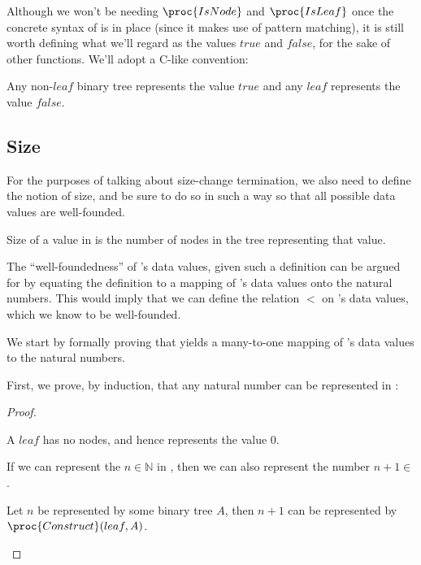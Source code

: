 Although we won't be needing $\proc{IsNode}$ and $\proc{IsLeaf}$ once the
concrete syntax of  is in place (since it makes use of pattern
matching), it is still worth defining what we'll regard as the values $true$
and $false$, for the sake of other functions. We'll adopt a C-like convention:

\begin{definition}\label{definition:true-false}

Any non-$leaf$ binary tree represents the value $true$ and any $leaf$
represents the value $false$.

\end{definition}

\subsection{Size}

For the purposes of talking about size-change termination, we also need to
define the notion of size, and be sure to do so in such a way so that all
possible data values are well-founded.

\begin{definition}\label{definition:size}

Size of a value in  is the number of nodes in the tree representing
that value.

\end{definition}

The ``well-foundedness'' of 's data values, given such a definition can
be argued for by equating the definition to a mapping of 's data values
onto the natural numbers. This would imply that we can define the relation $<$
on 's data values, which we know to be well-founded. 

We start by formally proving that  yields a many-to-one
mapping of 's data values to the natural numbers.

First, we prove, by induction, that any natural number can be represented in
:

\begin{proof}\ \\

\begin{description}[\setleftmargin{70pt}\setlabelstyle{\bf}]

\item [Base] A $leaf$ has no nodes, and hence represents the value $0$.

\item [Assumption] If we can represent the $n\in\mathbb{N}$ in , then
we can also represent the number $n+1\in$. 

\item [Induction] Let $n$ be represented by some binary tree $A$, then $n+1$
can be represented by $\proc{Construct}(leaf,A)$. 

\end{description}

\end{proof}


